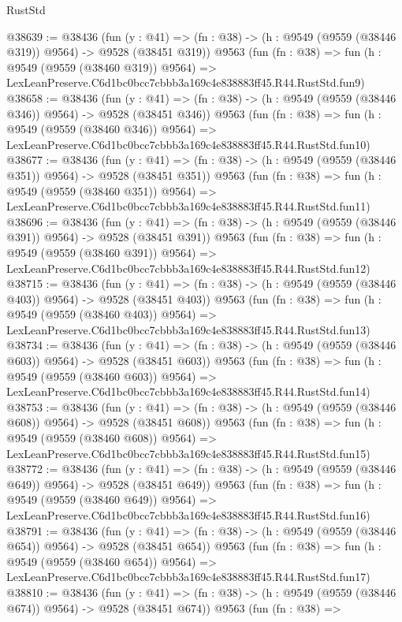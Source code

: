 \begin{lexlean}{RustStd}
\begin{coremodule}
@38639 := @38436
    (fun (y : @41) => (fn : @38) -> (h : @9549 (@9559 (@38446 @319)) @9564) -> @9528 (@38451 @319))
    @9563
    (fun (fn : @38) =>
    fun (h : @9549 (@9559 (@38460 @319)) @9564) =>
    LexLeanPreserve.C6d1bc0bcc7cbbb3a169c4e838883ff45.R44.RustStd.fun9)
@38658 := @38436
    (fun (y : @41) => (fn : @38) -> (h : @9549 (@9559 (@38446 @346)) @9564) -> @9528 (@38451 @346))
    @9563
    (fun (fn : @38) =>
    fun (h : @9549 (@9559 (@38460 @346)) @9564) =>
    LexLeanPreserve.C6d1bc0bcc7cbbb3a169c4e838883ff45.R44.RustStd.fun10)
@38677 := @38436
    (fun (y : @41) => (fn : @38) -> (h : @9549 (@9559 (@38446 @351)) @9564) -> @9528 (@38451 @351))
    @9563
    (fun (fn : @38) =>
    fun (h : @9549 (@9559 (@38460 @351)) @9564) =>
    LexLeanPreserve.C6d1bc0bcc7cbbb3a169c4e838883ff45.R44.RustStd.fun11)
@38696 := @38436
    (fun (y : @41) => (fn : @38) -> (h : @9549 (@9559 (@38446 @391)) @9564) -> @9528 (@38451 @391))
    @9563
    (fun (fn : @38) =>
    fun (h : @9549 (@9559 (@38460 @391)) @9564) =>
    LexLeanPreserve.C6d1bc0bcc7cbbb3a169c4e838883ff45.R44.RustStd.fun12)
@38715 := @38436
    (fun (y : @41) => (fn : @38) -> (h : @9549 (@9559 (@38446 @403)) @9564) -> @9528 (@38451 @403))
    @9563
    (fun (fn : @38) =>
    fun (h : @9549 (@9559 (@38460 @403)) @9564) =>
    LexLeanPreserve.C6d1bc0bcc7cbbb3a169c4e838883ff45.R44.RustStd.fun13)
@38734 := @38436
    (fun (y : @41) => (fn : @38) -> (h : @9549 (@9559 (@38446 @603)) @9564) -> @9528 (@38451 @603))
    @9563
    (fun (fn : @38) =>
    fun (h : @9549 (@9559 (@38460 @603)) @9564) =>
    LexLeanPreserve.C6d1bc0bcc7cbbb3a169c4e838883ff45.R44.RustStd.fun14)
@38753 := @38436
    (fun (y : @41) => (fn : @38) -> (h : @9549 (@9559 (@38446 @608)) @9564) -> @9528 (@38451 @608))
    @9563
    (fun (fn : @38) =>
    fun (h : @9549 (@9559 (@38460 @608)) @9564) =>
    LexLeanPreserve.C6d1bc0bcc7cbbb3a169c4e838883ff45.R44.RustStd.fun15)
@38772 := @38436
    (fun (y : @41) => (fn : @38) -> (h : @9549 (@9559 (@38446 @649)) @9564) -> @9528 (@38451 @649))
    @9563
    (fun (fn : @38) =>
    fun (h : @9549 (@9559 (@38460 @649)) @9564) =>
    LexLeanPreserve.C6d1bc0bcc7cbbb3a169c4e838883ff45.R44.RustStd.fun16)
@38791 := @38436
    (fun (y : @41) => (fn : @38) -> (h : @9549 (@9559 (@38446 @654)) @9564) -> @9528 (@38451 @654))
    @9563
    (fun (fn : @38) =>
    fun (h : @9549 (@9559 (@38460 @654)) @9564) =>
    LexLeanPreserve.C6d1bc0bcc7cbbb3a169c4e838883ff45.R44.RustStd.fun17)
@38810 := @38436
    (fun (y : @41) => (fn : @38) -> (h : @9549 (@9559 (@38446 @674)) @9564) -> @9528 (@38451 @674))
    @9563
    (fun (fn : @38) =>

\end{coremodule}
\end{lexlean}
